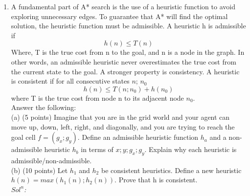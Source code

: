 \documentclass[a4 paper]{article}
\begin{document}
\begin{enumerate}
    \item A fundamental part of A* search is the use of a heuristic function to avoid exploring
unnecessary edges. To guarantee that A* will find the optimal solution, the heuristic function must be admissible. A heuristic h is admissible if 
\begin{equation*}
h(n) \leq T(n)
\end{equation*}
Where, T is the true cost from n to the goal, and n is a node in the graph. In other words, an admissible heuristic never overestimates the true cost from the current state to the goal. A stronger property is consistency. A heuristic is consistent if for all consecutive states $n$; $n_0$
    \begin{equation*}
        h(n) \leq T(n;n_0)+h(n_0)
    \end{equation*}
where T is the true cost from node n to its adjacent node $n_0$. \\
Answer the following: \\
(a) (5 points) Imagine that you are in the grid world and your agent can move up, down, left, right, and diagonally, and you are trying to reach the goal cell $f = (g_x;g_y)$. Define an admissible heuristic function $h_a$ and a non-admissible heuristic $h_b$ in terms of $x; y; g_x; g_y$. Explain why each heuristic is admissible/non-admissible.\\
(b) (10 points) Let $h_1$ and $h_2$ be consistent heuristics. Define a new heuristic $h(n)=max(h_1(n); h_2(n))$. Prove that h is consistent. \\
    \textit{$Sol^n$:}
\end{enumerate}
\end{document}

